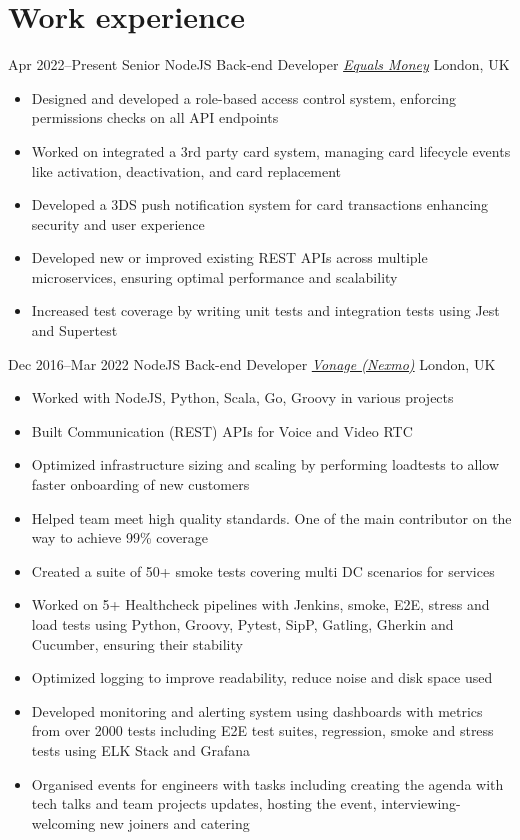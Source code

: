 \section{\normalfont Work experience}
\vspace{-.1cm}
\begin{entrylist}
\entry
{Apr 2022--Present}
{Senior NodeJS Back-end Developer {\normalfont \emph{\href{https://equalsmoney.com/}{Equals Money}}}}
{London, UK}
\vspace{-0.6cm}
\begin{itemize}[leftmargin=.6cm]
	\item Designed and developed a role-based access control system, enforcing permissions checks on all API endpoints
	\item Worked on integrated a 3rd party card system, managing card lifecycle events like activation, deactivation, and card replacement
	\item Developed a 3DS push notification system for card transactions enhancing security and user experience
	\item Developed new or improved existing REST APIs across multiple microservices, ensuring optimal performance and scalability
	\item Increased test coverage by writing unit tests and integration tests using Jest and Supertest
\end{itemize}

\entry
{Dec 2016--Mar 2022}
{NodeJS Back-end Developer {\normalfont \emph{\href{https://www.vonage.co.uk/}{Vonage (Nexmo)}}}}
{London, UK}
\vspace{-0.6cm}
\begin{itemize}[leftmargin=.6cm]
	\item Worked with NodeJS, Python, Scala, Go, Groovy in various projects
	\item Built Communication (REST) APIs for Voice and Video RTC
	\item Optimized infrastructure sizing and scaling by performing loadtests to allow faster onboarding of new customers
	\item Helped team meet high quality standards. One of the main contributor on the way to achieve 99\% coverage
	\item Created a suite of 50+ smoke tests covering multi DC scenarios for services
	\item Worked on 5+ Healthcheck pipelines with Jenkins, smoke, E2E, stress and load tests using Python, Groovy, Pytest, SipP, Gatling, Gherkin and Cucumber, ensuring their stability
	\item Optimized logging to improve readability, reduce noise and disk space used
	\item Developed monitoring and alerting system using dashboards with metrics from over 2000 tests including E2E test suites, regression, smoke and stress tests using ELK Stack and Grafana
	\item Organised events for engineers with tasks including creating the agenda with tech talks and team projects updates, hosting the event, interviewing-welcoming new joiners and catering
\end{itemize}


\end{entrylist}
